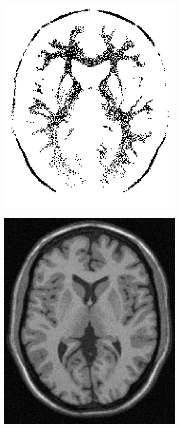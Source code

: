 \documentclass[letterpaper,12pt]{article}
\theoremstyle{plain}
\begin{document}
\begin{figure}[h]
\begin{subfigure}[h]{0.24\linewidth}
            \includegraphics[width=\textwidth]{Figuras/ImageA_binary.png}
         \end{subfigure}
         \begin{subfigure}[h]{0.24\linewidth}
            \centering
            \includegraphics[width=\textwidth]{Figuras/sustraction_binary.png}

\end{subfigure}
\end{figure}
\end{document}
